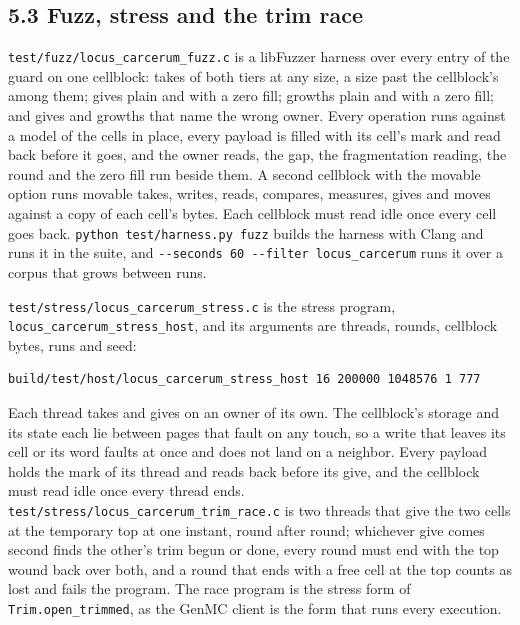 \subsection{\texorpdfstring{5.3 Fuzz, stress and the trim race}{5.3 Fuzz, stress and the trim race}}

\texttt{test/\allowbreak{}fuzz/\allowbreak{}locus\_\allowbreak{}carcerum\_\allowbreak{}fuzz.\allowbreak{}c} is a libFuzzer harness over every entry of the guard on one cellblock: takes of both tiers at any size, a size past the cellblock's among them; gives plain and with a zero fill; growths plain and with a zero fill; and gives and growths that name the wrong owner. Every operation runs against a model of the cells in place, every payload is filled with its cell's mark and read back before it goes, and the owner reads, the gap, the fragmentation reading, the round and the zero fill run beside them. A second cellblock with the movable option runs movable takes, writes, reads, compares, measures, gives and moves against a copy of each cell's bytes. Each cellblock must read idle once every cell goes back. \texttt{python test/\allowbreak{}harness.\allowbreak{}py fuzz} builds the harness with Clang and runs it in the suite, and \texttt{-\allowbreak{}-\allowbreak{}seconds 60 -\allowbreak{}-\allowbreak{}filter locus\_\allowbreak{}carcerum} runs it over a corpus that grows between runs.

\texttt{test/\allowbreak{}stress/\allowbreak{}locus\_\allowbreak{}carcerum\_\allowbreak{}stress.\allowbreak{}c} is the stress program, \texttt{locus\_\allowbreak{}carcerum\_\allowbreak{}stress\_\allowbreak{}host}, and its arguments are threads, rounds, cellblock bytes, runs and seed:

\begin{Verbatim}
build/test/host/locus_carcerum_stress_host 16 200000 1048576 1 777
\end{Verbatim}

Each thread takes and gives on an owner of its own. The cellblock's storage and its state each lie between pages that fault on any touch, so a write that leaves its cell or its word faults at once and does not land on a neighbor. Every payload holds the mark of its thread and reads back before its give, and the cellblock must read idle once every thread ends. \texttt{test/\allowbreak{}stress/\allowbreak{}locus\_\allowbreak{}carcerum\_\allowbreak{}trim\_\allowbreak{}race.\allowbreak{}c} is two threads that give the two cells at the temporary top at one instant, round after round; whichever give comes second finds the other's trim begun or done, every round must end with the top wound back over both, and a round that ends with a free cell at the top counts as lost and fails the program. The race program is the stress form of \texttt{Trim.\allowbreak{}open\_\allowbreak{}trimmed}, as the GenMC client is the form that runs every execution.

